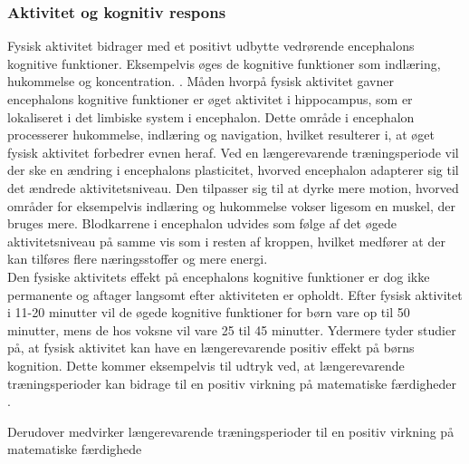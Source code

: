 \subsubsection{Aktivitet og kognitiv respons}
Fysisk aktivitet bidrager med et positivt udbytte vedrørende encephalons kognitive funktioner. Eksempelvis øges de kognitive funktioner som indlæring, hukommelse og koncentration. %
\citep{Berchtold2010,Bugge2015,Schmidt2015}. 
Måden hvorpå fysisk aktivitet gavner encephalons kognitive funktioner er øget aktivitet i hippocampus, som er lokaliseret i det limbiske system i encephalon. Dette område i encephalon processerer hukommelse, indlæring og navigation, hvilket resulterer i, at øget fysisk aktivitet forbedrer evnen heraf. Ved en længerevarende træningsperiode vil der ske en ændring i encephalons plasticitet, hvorved encephalon adapterer sig til det ændrede aktivitetsniveau. Den tilpasser sig til at dyrke mere motion, hvorved områder for eksempelvis indlæring og hukommelse vokser ligesom en muskel, der bruges mere. Blodkarrene i encephalon udvides som følge af det øgede aktivitetsniveau på samme vis som i resten af kroppen, hvilket medfører at der kan tilføres flere næringsstoffer og mere energi. \citep{Cotman2007}\\
Den fysiske aktivitets effekt på encephalons kognitive funktioner er dog ikke permanente og aftager langsomt efter aktiviteten er opholdt. Efter fysisk aktivitet i 11-20 minutter vil de øgede kognitive funktioner for børn vare op til 50 minutter, mens de hos voksne vil vare 25 til 45 minutter. \citep{Cotman2007} Ydermere tyder studier på, at fysisk aktivitet kan have en længerevarende positiv effekt på børns kognition. Dette kommer eksempelvis til udtryk ved, at længerevarende træningsperioder kan bidrage til en positiv virkning på matematiske færdigheder \citep{Bugge2015,SibleyEtnier2003}.


Derudover medvirker længerevarende træningsperioder til en positiv virkning på matematiske færdighede

